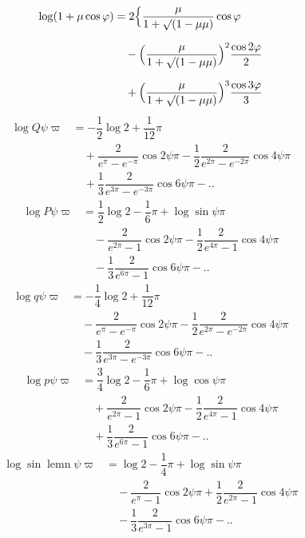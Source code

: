 \begingroup
\renewcommand{\arraystretch}{1.45}
\[
\begin{aligned}\log(1+\mu\cos\varphi)
&=2\Bigl\{\dfrac{\mu}{1+\surd(1-\mu\mu)}\cos\varphi
\\[7pt]&\quad{}-\Bigl(\dfrac{\mu}{1+\surd(1-\mu\mu)}\Bigr)^{2}\dfrac{\cos2\varphi}{2}
\\[7pt]&\quad{}+\Bigl(\dfrac{\mu}{1+\surd(1-\mu\mu)}\Bigr)^{3}\dfrac{\cos3\varphi}{3}\end{aligned}
\]
\[
\begin{aligned}
\log Q\psi\varpi&=-\dfrac12\log2+\dfrac1{12}\pi\\[5pt]
&\quad+\dfrac{2}{e^{\pi}-e^{-\pi}}\cos2\psi\pi
-\dfrac12\dfrac{2}{e^{2\pi}-e^{-2\pi}}\cos4\psi\pi
\\[7pt]&\quad{}+\dfrac13\dfrac{2}{e^{3\pi}-e^{-3\pi}}\cos6\psi\pi-\mathord{.}\mathord{.}
\end{aligned}
\]
\[
\begin{aligned}
\log P\psi\varpi&=\dfrac12\log2-\dfrac16\pi+\log\sin\psi\pi\\[5pt]
&\quad-\dfrac{2}{e^{2\pi}-1}\cos2\psi\pi
-\dfrac12\dfrac{2}{e^{4\pi}-1}\cos4\psi\pi
\\[7pt]&\quad{}-\dfrac13\dfrac{2}{e^{6\pi}-1}\cos6\psi\pi-\mathord{.}\mathord{.}
\end{aligned}
\]
\[
\begin{aligned}
\log q\psi\varpi&=-\dfrac14\log2+\dfrac1{12}\pi\\[5pt]
&\quad-\dfrac{2}{e^{\pi}-e^{-\pi}}\cos2\psi\pi
-\dfrac12\dfrac{2}{e^{2\pi}-e^{-2\pi}}\cos4\psi\pi
\\[7pt]&\quad{}-\dfrac13\dfrac{2}{e^{3\pi}-e^{-3\pi}}\cos6\psi\pi-\mathord{.}\mathord{.}
\end{aligned}
\]
\[
\begin{aligned}
\log p\psi\varpi&=\dfrac34\log2-\dfrac16\pi+\log\cos\psi\pi\\[5pt]
&\quad+\dfrac{2}{e^{2\pi}-1}\cos2\psi\pi
-\dfrac12\dfrac{2}{e^{4\pi}-1}\cos4\psi\pi
\\[7pt]&\quad{}+\dfrac13\dfrac{2}{e^{6\pi}-1}\cos6\psi\pi-\mathord{.}\mathord{.}
\end{aligned}
\]
\[
\begin{aligned}
\log\sin\operatorname{lemn}\psi\varpi&=\log2-\dfrac14\pi+\log\sin\psi\pi\\[5pt]
&\quad-\dfrac{2}{e^{\pi}-1}\cos2\psi\pi
+\dfrac12\dfrac{2}{e^{2\pi}-1}\cos4\psi\pi
\\[7pt]&\quad{}-\dfrac13\dfrac{2}{e^{3\pi}-1}\cos6\psi\pi-\mathord{.}\mathord{.}
\end{aligned}
\]



